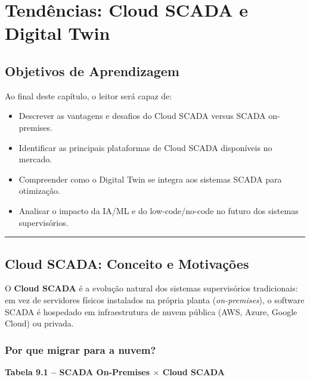 \chapter{Tendências: Cloud SCADA e Digital Twin}\label{tenduxeancias-cloud-scada-e-digital-twin}

\section*{Objetivos de Aprendizagem}

Ao final deste capítulo, o leitor será capaz de:

\begin{itemize}
\tightlist
\item
  Descrever as vantagens e desafios do Cloud SCADA versus SCADA on-premises.
\item
  Identificar as principais plataformas de Cloud SCADA disponíveis no mercado.
\item
  Compreender como o Digital Twin se integra aos sistemas SCADA para otimização.
\item
  Analisar o impacto da IA/ML e do low-code/no-code no futuro dos sistemas supervisórios.
\end{itemize}

\begin{center}\rule{0.5\linewidth}{0.5pt}\end{center}

\section{Cloud SCADA: Conceito e Motivações}\label{cloud-scada-conceito-e-motivauxe7uxf5es}

O \textbf{Cloud SCADA} é a evolução natural dos sistemas supervisórios tradicionais: em vez de servidores físicos instalados na própria planta (\emph{on-premises}), o software SCADA é hospedado em infraestrutura de nuvem pública (AWS, Azure, Google Cloud) ou privada.

\subsection{Por que migrar para a nuvem?}\label{por-que-migrar-para-a-nuvem}

\textbf{Tabela 9.1 -- SCADA On-Premises \ensuremath{\times} Cloud SCADA}

